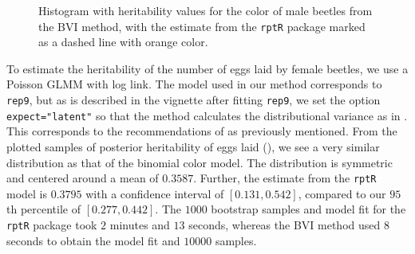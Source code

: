 \begin{figure}[H]
  \centering
  \caption{Histogram with heritability values for the color of male beetles from the BVI method, with the estimate from the \texttt{rptR} package marked as a dashed line with orange color.}
\end{figure}
\noindent To estimate the heritability of the number of eggs laid by female beetles, we use a Poisson GLMM with log link. The model used in our method corresponds to \texttt{rep9}, but as is described in the vignette after fitting \texttt{rep9}, we set the option \texttt{expect="latent"} so that the method calculates the distributional variance as in . This corresponds to the recommendations of \citet{nakagawa2017} as previously mentioned. From the plotted samples of posterior heritability of eggs laid (), we see a very similar distribution as that of the binomial color model. The distribution is symmetric and centered around a mean of $0.3587$. Further, the estimate from the \texttt{rptR} model is $0.3795$ with a confidence interval of $[0.131, 0.542]$, compared to our $95$th percentile of $[0.277, 0.442]$. The $1000$ bootstrap samples and model fit for the \texttt{rptR} package took $2$ minutes and $13$ seconds, whereas the BVI method used $8$ seconds to obtain the model fit and $10000$ samples.
